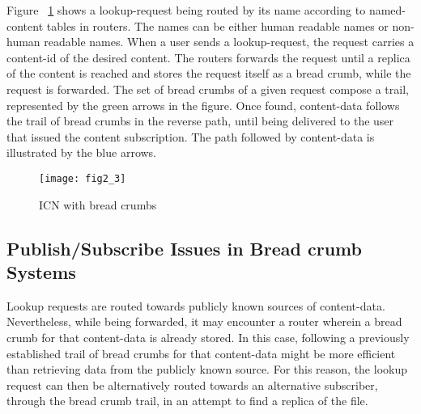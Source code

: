 Figure ~\ref{systemicnbread} shows a lookup-request being routed by its name according to named-content tables in routers. 
The names 
can be either human readable names or non-human readable names. When a user sends a lookup-request, the request carries
a content-id of the desired content. The routers forwards the request until a replica of
the content is reached and stores the request itself as a bread crumb, while the request is forwarded. 
The set of bread crumbs of a given request compose
a trail, represented by the green arrows in the figure. Once found, content-data follows the trail of bread crumbs
in the reverse path, until being delivered to the user that issued the content subscription. The path followed
by content-data is illustrated by the blue arrows.


\begin{figure}
\center
\texttt{[image: fig2\_3]}
\caption{ICN with bread crumbs}
\label{systemicnbread}
\end{figure}



\subsection{Publish/Subscribe Issues in Bread crumb Systems}


\begin{comment}
The lookup requests are directed towards the nearest copy stored in the network, according to some metric 
at named-content tables. \eat{Lookup-requests carry content-ids composed of human readable names. Those } Content names are used
by the routers, to forward the requests according to information contained in routing-tables. As lookup-requests are forwarded, they are stored at 
the routers as a bread crumbs, which implies lookup-requests leaving a trail of bread crumbs from the subscriber up to 
the corresponding content-data storage location. Content-data is delivered in the reverse path of bread crumbs.

\end{comment}

Lookup requests are routed towards publicly known sources of  content-data. 
Nevertheless, while being forwarded, it may encounter a router wherein a bread crumb for that content-data
is already stored. In this case, following a previously established trail of bread crumbs for that content-data might be more efficient than 
retrieving data from  the publicly 
known source.  For this reason, the lookup request can then be alternatively routed towards an alternative subscriber,
through the bread crumb trail, in an attempt to find a replica of the file. 



